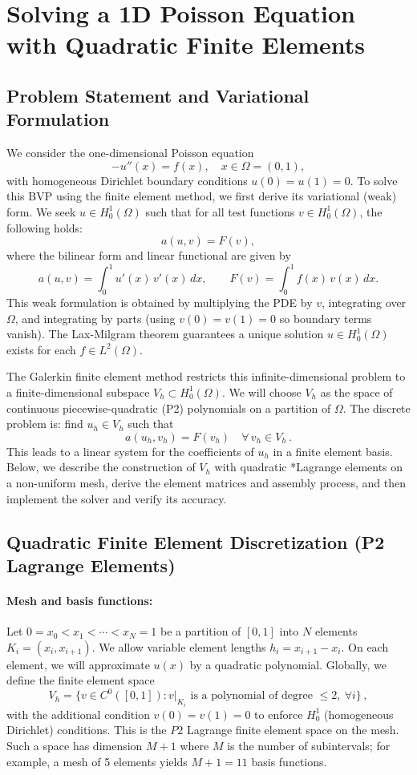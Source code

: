 \documentclass[a4paper,10pt]{article}
\begin{document}

\clearpage


\section{Solving a 1D Poisson Equation with Quadratic Finite Elements}

\subsection{Problem Statement and Variational Formulation}

We consider the one-dimensional Poisson equation
\[
	-u''(x) = f(x), \quad x \in \Omega=(0,1),
\]
with homogeneous Dirichlet boundary conditions $u(0)=u(1)=0$.
To solve this BVP using the finite element method, we first derive its variational (weak) form.
We seek $u \in H^1_0(\Omega)$ such that for all test functions $v \in H^1_0(\Omega)$, the following holds:
\[
	a(u,v) = F(v),
\]
where the bilinear form and linear functional are given by
\[
	a(u,v) = \int_0^1 u'(x)\,v'(x)\,dx, \qquad F(v) = \int_0^1 f(x)\,v(x)\,dx.
\]
This weak formulation is obtained by multiplying the PDE by $v$, integrating over $\Omega$, and integrating by parts (using $v(0)=v(1)=0$ so boundary terms vanish). The Lax-Milgram theorem guarantees a unique solution $u \in H^1_0(\Omega)$ exists for each $f\in L^2(\Omega)$.

The Galerkin finite element method restricts this infinite-dimensional problem to a finite-dimensional subspace $V_h \subset H^1_0(\Omega)$. We will choose $V_h$ as the space of continuous piecewise-quadratic (P2) polynomials on a partition of $\Omega$. The discrete problem is: find $u_h \in V_h$ such that
\[
	a(u_h, v_h) = F(v_h) \quad \forall\, v_h \in V_h\,.\tag{*}
\]
This leads to a linear system for the coefficients of $u_h$ in a finite element basis. Below, we describe the construction of $V_h$ with quadratic *Lagrange\* elements on a non-uniform mesh, derive the element matrices and assembly process, and then implement the solver and verify its accuracy.

\subsection{Quadratic Finite Element Discretization (P2 Lagrange Elements)}

\paragraph{Mesh and basis functions:}
Let $0 = x_0 < x_1 < \cdots < x_N = 1$ be a partition of $[0,1]$ into $N$ elements $K_i = (x_i, x_{i+1})$.
We allow variable element lengths $h_i = x_{i+1}-x_i$. On each element, we will approximate $u(x)$ by a quadratic polynomial. Globally, we define the finite element space
$$
	V_h = \{ v \in C^0([0,1]) : v|_{K_i} \text{ is a polynomial of degree }\le 2,\ \forall i\}\,,
$$
with the additional condition $v(0)=v(1)=0$ to enforce $H^1_0$ (homogeneous Dirichlet) conditions.
This is the $P2$ Lagrange finite element space on the mesh. Such a space has dimension $M+1$ where $M$ is the number of subintervals; for example, a mesh of 5 elements yields $M+1=11$ basis functions.
\end{document}
